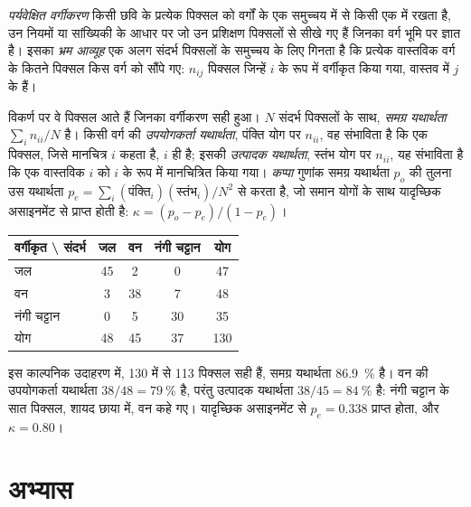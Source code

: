 \begin{definition}[पर्यवेक्षित वर्गीकरण; भ्रम आव्यूह]\label{def:b3:remote-sensing-gis:classification}
\emph{पर्यवेक्षित वर्गीकरण} किसी छवि के प्रत्येक पिक्सल को
वर्गों के एक समुच्चय में से किसी एक में रखता है, उन नियमों या सांख्यिकी के आधार पर
जो उन प्रशिक्षण पिक्सलों से सीखे गए हैं जिनका वर्ग भूमि पर ज्ञात है।
इसका \emph{भ्रम आव्यूह} एक अलग
संदर्भ पिक्सलों के समुच्चय के लिए गिनता है कि प्रत्येक वास्तविक वर्ग के कितने
पिक्सल किस वर्ग को सौंपे गए: $n_{ij}$ पिक्सल जिन्हें $i$ के रूप में वर्गीकृत किया गया, वास्तव में $j$ के हैं।
\end{definition}

विकर्ण पर वे पिक्सल आते हैं जिनका वर्गीकरण सही हुआ। $N$ संदर्भ पिक्सलों के साथ,
\emph{समग्र यथार्थता} $\sum_i n_{ii}/N$ है। किसी वर्ग की \emph{उपयोगकर्ता
यथार्थता}, पंक्ति योग पर $n_{ii}$, वह संभाविता है कि
एक पिक्सल, जिसे मानचित्र $i$ कहता है, $i$ ही है; इसकी \emph{उत्पादक
यथार्थता}, स्तंभ योग पर $n_{ii}$, यह संभाविता है कि एक वास्तविक $i$ को $i$ के रूप में मानचित्रित किया गया।
\emph{कप्पा} गुणांक समग्र यथार्थता $p_o$ की तुलना
उस यथार्थता $p_e = \sum_i (\text{पंक्ति}_i)(\text{स्तंभ}_i)/N^2$ से करता है, जो समान योगों के साथ यादृच्छिक असाइनमेंट से प्राप्त होती
है: $\kappa = (p_o - p_e)/(1 -
p_e)$।

\begin{center}
\small
\begin{tabular}{l|ccc|c}
\hline
वर्गीकृत \textbackslash{} संदर्भ & जल & वन & नंगी चट्टान & योग \\
\hline
जल & 45 & 2 & 0 & 47 \\
वन & 3 & 38 & 7 & 48 \\
नंगी चट्टान & 0 & 5 & 30 & 35 \\
\hline
योग & 48 & 45 & 37 & 130 \\
\hline
\end{tabular}
\end{center}

इस काल्पनिक उदाहरण में, 130 में से 113 पिक्सल सही हैं, समग्र
यथार्थता \qty{86.9}{\percent} है। वन की उपयोगकर्ता यथार्थता
$38/48 = \qty{79}{\percent}$ है, परंतु उत्पादक यथार्थता $38/45 =
\qty{84}{\percent}$ है: नंगी चट्टान के सात पिक्सल, शायद छाया में, वन
कहे गए। यादृच्छिक असाइनमेंट से $p_e = 0.338$ प्राप्त होता, और $\kappa =
0.80$।

\section{अभ्यास}

